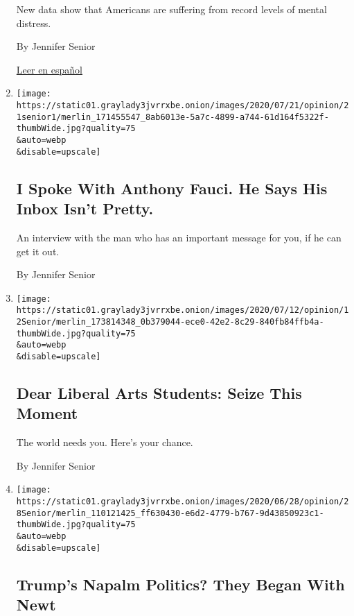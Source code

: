 \begin{enumerate}
  New data show that Americans are suffering from record levels of
  mental distress.

  By Jennifer Senior

  \href{https://www.nytimes3xbfgragh.onion/es/2020/08/07/espanol/opinion/ansiedad-coronavirus.html}{Leer
  en español}
\item
  \href{/2020/07/21/opinion/anthony-fauci-coronavirus.html}{}

  \texttt{[image: https://static01.graylady3jvrrxbe.onion/images/2020/07/21/opinion/21senior1/merlin\_171455547\_8ab6013e-5a7c-4899-a744-61d164f5322f-thumbWide.jpg?quality=75\\\&auto=webp\\\&disable=upscale]}

  \hypertarget{i-spoke-with-anthony-fauci-he-says-his-inbox-isnt-pretty}{%
  \subsection{I Spoke With Anthony Fauci. He Says His Inbox Isn't
  Pretty.}\label{i-spoke-with-anthony-fauci-he-says-his-inbox-isnt-pretty}}

  An interview with the man who has an important message for you, if he
  can get it out.

  By Jennifer Senior
\item
  \href{/2020/07/12/opinion/liberal-arts-college-covid.html}{}

  \texttt{[image: https://static01.graylady3jvrrxbe.onion/images/2020/07/12/opinion/12Senior/merlin\_173814348\_0b379044-ece0-42e2-8c29-840fb84ffb4a-thumbWide.jpg?quality=75\\\&auto=webp\\\&disable=upscale]}

  \hypertarget{dear-liberal-arts-students-seize-this-moment}{%
  \subsection{Dear Liberal Arts Students: Seize This
  Moment}\label{dear-liberal-arts-students-seize-this-moment}}

  The world needs you. Here's your chance.

  By Jennifer Senior
\item
  \href{/2020/06/28/opinion/trump-newt-gingrich.html}{}

  \texttt{[image: https://static01.graylady3jvrrxbe.onion/images/2020/06/28/opinion/28Senior/merlin\_110121425\_ff630430-e6d2-4779-b767-9d43850923c1-thumbWide.jpg?quality=75\\\&auto=webp\\\&disable=upscale]}

  \hypertarget{trumps-napalm-politics-they-began-with-newt}{%
  \subsection{Trump's Napalm Politics? They Began With
  Newt}\label{trumps-napalm-politics-they-began-with-newt}}


\end{enumerate}
